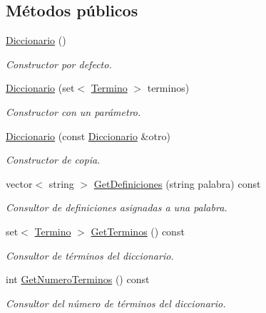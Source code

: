 \subsection*{Métodos públicos}
\begin{DoxyCompactItemize}
\item 
\mbox{\label{classDiccionario_aa0a2191ec706b256c35b5229cc197b15}} 
\hyperlink{classDiccionario_aa0a2191ec706b256c35b5229cc197b15}{Diccionario} ()
\begin{DoxyCompactList}\small\item\em Constructor por defecto. \end{DoxyCompactList}\item 
\hyperlink{classDiccionario_a38334390fc9b673fb674f7e712c65657}{Diccionario} (set$<$ \hyperlink{classTermino}{Termino} $>$ terminos)
\begin{DoxyCompactList}\small\item\em Constructor con un parámetro. \end{DoxyCompactList}\item 
\hyperlink{classDiccionario_a5f79e840a08666f29b527eb78be167e0}{Diccionario} (const \hyperlink{classDiccionario}{Diccionario} \&otro)
\begin{DoxyCompactList}\small\item\em Constructor de copia. \end{DoxyCompactList}\item 
vector$<$ string $>$ \hyperlink{classDiccionario_af57dab936ac05b29da85d9939b5cfaa6}{Get\+Definiciones} (string palabra) const
\begin{DoxyCompactList}\small\item\em Consultor de definiciones asignadas a una palabra. \end{DoxyCompactList}\item 
set$<$ \hyperlink{classTermino}{Termino} $>$ \hyperlink{classDiccionario_a63099f1e3380fe0ba0a69eadb89adb32}{Get\+Terminos} () const
\begin{DoxyCompactList}\small\item\em Consultor de términos del diccionario. \end{DoxyCompactList}\item 
int \hyperlink{classDiccionario_a52ee9ad6a4b58befe9c3603e405cb360}{Get\+Numero\+Terminos} () const
\begin{DoxyCompactList}\small\item\em Consultor del número de términos del diccionario. \end{DoxyCompactList}\item 

\end{DoxyCompactItemize}
